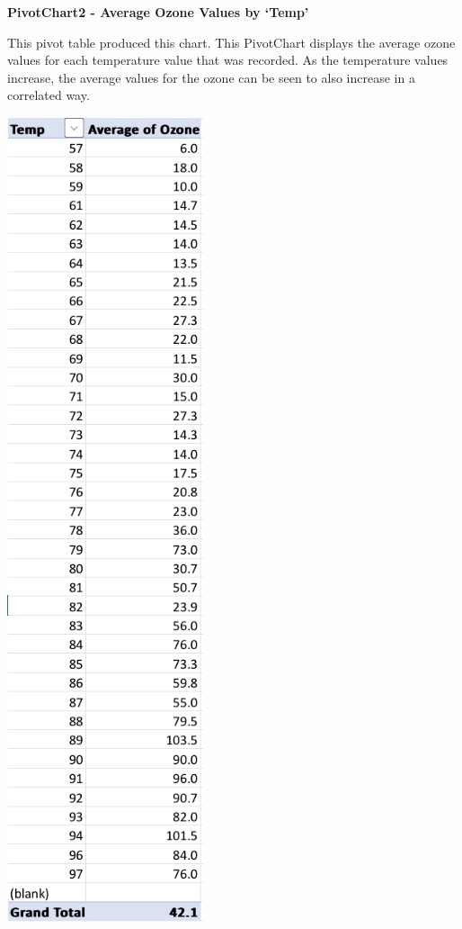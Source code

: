 \documentclass[
  letterpaper,
  DIV=11,
  numbers=noendperiod]{scrreprt}
\begin{document}
\textbf{PivotChart2 - Average Ozone Values by `Temp'}

This pivot table produced this chart. This PivotChart displays the
average ozone values for each temperature value that was recorded. As
the temperature values increase, the average values for the ozone can be
seen to also increase in a correlated way.

\includegraphics{PivotTable2_AverageOzoneByTemp_Pena.png}
\end{document}
